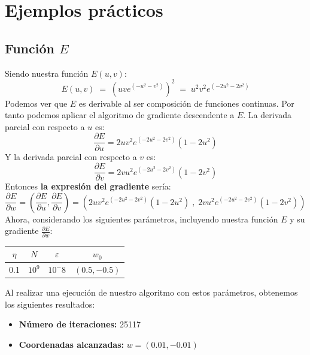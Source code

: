 \documentclass{article}
\begin{document}
    \pagebreak
    \section{Ejemplos prácticos}
    \subsection{Función $E$}
    Siendo nuestra función $E(u,v)$:
    \begin{equation*} \label{e}
        E(u,v) \; = \; (uve^{(-u^2-v^2)})^2 \; = \; u^2v^2e^{(-2u^2-2v^2)}
    \end{equation*}
    Podemos ver que $E$ es derivable al ser composición de funciones continuas.
    Por tanto podemos aplicar el algoritmo de gradiente descendente a $E$.
    \linebreak
    La derivada parcial con respecto a $u$ es:
    \begin{equation*} \label{deu}
        \frac{\partial E}{\partial u} = 2uv^2e^{(-2u^2-2v^2)}(1 - 2u^2)
    \end{equation*}
    Y la derivada parcial con respecto a $v$ es:
    \begin{equation*} \label{dev}
        \frac{\partial E}{\partial v} = 2vu^2e^{(-2u^2-2v^2)}(1-2v^2)
    \end{equation*}
    Entonces \textbf{la expresión del gradiente} sería:
    \begin{equation*}
        \frac{\partial E}{\partial w} 
        = \left(\frac{\partial E}{\partial u},\frac{\partial E}{\partial v}\right) 
        = \left(2uv^2e^{(-2u^2-2v^2)}(1 - 2u^2)\;,\;2vu^2e^{(-2u^2-2v^2)}(1-2v^2)\right)
    \end{equation*}
    Ahora, considerando los siguientes parámetros,
    incluyendo nuestra función $E$ y su gradiente $\frac{\partial E}{\partial w}$:
    \begin{center}
        \begin{tabular}{ |c|c|c|c| }
            \hline
            $\eta$ & $N$ & $\varepsilon$ & $w_0$ \\
            \hline
            0.1 & $10^9$ & $10^-8$ & $(0.5,-0.5)$ \\
            \hline
        \end{tabular}
    \end{center}
    Al realizar una ejecución de nuestro algoritmo con estos parámetros, obtenemos los siguientes resultados:
    \begin{itemize}
        \item[]\textbf{Número de iteraciones:} 25117
        \item[]\textbf{Coordenadas alcanzadas:} $w = (0.01,-0.01)$
    \end{itemize}
\end{document}
